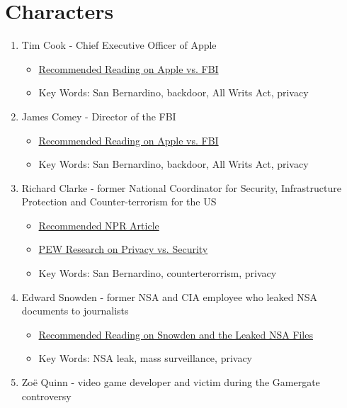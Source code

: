 \documentclass[12pt]{amsart}
\theoremstyle{plain}
\theoremstyle{definition}
\begin{document}
\newpage
\section{Characters}
\begin{enumerate}[1.]
	\item Tim Cook - Chief Executive Officer of Apple
		\begin{itemize}
			\item \href{https://en.wikipedia.org/wiki/FBI\%E2\%80\%93Apple_encryption_dispute}{Recommended Reading on Apple vs. FBI}
			\item Key Words:  San Bernardino, backdoor, All Writs Act, privacy
		\end{itemize}
	\item James Comey - Director of the FBI
		\begin{itemize}
			\item \href{https://en.wikipedia.org/wiki/FBI\%E2\%80\%93Apple_encryption_dispute}{Recommended Reading on Apple vs. FBI}
			\item Key Words:  San Bernardino, backdoor, All Writs Act, privacy
		\end{itemize}
	\item Richard Clarke - former National Coordinator for Security, Infrastructure Protection and Counter-terrorism for the US
		\begin{itemize}
			\item \href{http://www.npr.org/2016/03/14/470347719/encryption-and-privacy-are-larger-issues-than-fighting-terrorism-clarke-says}{Recommended NPR Article}			
			\item \href{http://www.pewresearch.org/fact-tank/2016/02/19/americans-feel-the-tensions-between-privacy-and-security-concerns/}{PEW Research on Privacy vs. Security}			
			\item Key Words: San Bernardino, counterterorrism, privacy
		\end{itemize}
	\item Edward Snowden - former NSA and CIA employee who leaked NSA documents to journalists
		\begin{itemize}
			\item \href{https://www.theguardian.com/world/interactive/2013/nov/01/snowden-nsa-files-surveillance-revelations-decoded#section/1}{Recommended Reading on Snowden and the Leaked NSA Files}	
			\item Key Words: NSA leak, mass surveillance, privacy
		\end{itemize}
	\item Zo\"{e} Quinn - video game developer and victim during the Gamergate controversy

\end{enumerate}
\end{document}
